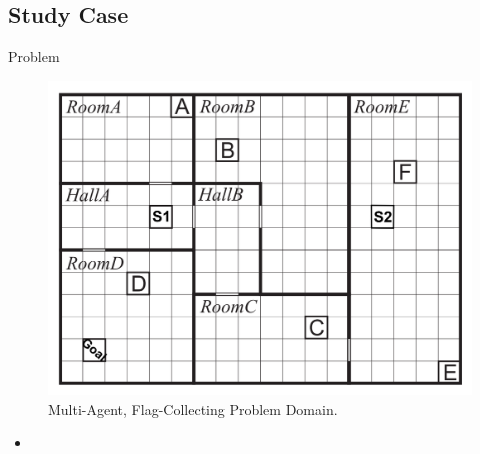 \documentclass{bredelebeamer}
\begin{document}
\subsection{Study Case}
\begin{frame}{Problem}

\begin{figure}[h!]
\centering
  \includegraphics[height=0.5\textheight]{../article/img/stydyCase.png}
  \caption{Multi-Agent, Flag-Collecting Problem Domain.}
  \label{fig:studycase1}
\end{figure}

\begin{block}{}
\begin{itemize}
\item 
\end{itemize}
\end{block}

\end{frame}
\end{document}
